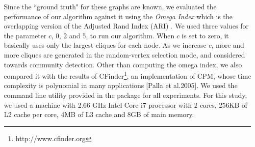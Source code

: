 %
%
%
%
%
%

Since the ``ground truth" for these graphs are known, we evaluated the performance of our algorithm against it using the {\it Omega Index} \cite{doi:10.1207/s15327906mbr2302_6} which is the overlapping version of the Adjusted Rand Index (ARI) \cite{ARI_paper_1985}.
We used three values for the parameter $c$, 0, 2 and 5, to run our algorithm. When $c$ is set to zero, it basically uses only the largest cliques for each node. As we increase $c$, more and more cliques are generated in the random-vertex selection mode, and considered towards community detection. Other than computing the omega index, we also compared it with the results of CFinder\footnote{http://www.cfinder.org}, an implementation of CPM, whose time complexity is polynomial in many applications [Palla et al.2005]. We used the command line utility provided in the package for all experiments. For this study, we used a machine with 2.66 GHz Intel Core i7 processor with 2 cores, 256KB of L2 cache per core, 4MB of L3 cache and 8GB of main memory.


